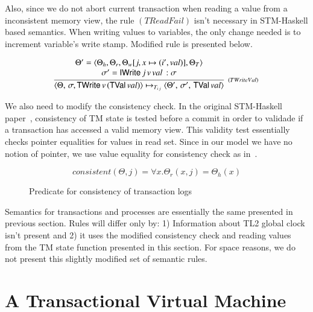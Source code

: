 \documentclass[3p,times,procedia]{elsarticle}
\theoremstyle{definition}
\newcommand{\C}[1]{\red{\mathsf{#1}}}
\begin{document}
Also, since we do not abort current transaction when reading a value from a inconsistent
memory view, the rule $(TReadFail)$ isn't necessary in STM-Haskell based semantics. When writing
values to variables, the only change needed is to increment variable's write stamp.
Modified rule is presented below.

\[
  \begin{array}{l}
  \infer[_{(TWriteVal)}]
        { \langle \Theta, \, \sigma, \ensuremath{\C{TWrite}}\,v\,(\ensuremath{\C{TVal}}\,val)\rangle \mapsto_{T_{i\,j}}
          \langle \Theta', \, \sigma',\,\ensuremath{\C{TVal}}\,val\rangle}
        {\begin{array}{c}
            \Theta' = \langle \Theta_h, \Theta_r, \Theta_w[j,x \mapsto (i',val)], \Theta_T\rangle \\
            \sigma' = \ensuremath{\C{IWrite}}\,j\,v\,val\, : \sigma \\
         \end{array}}
  \end{array}
\]


We also need to modify the consistency check. In the original STM-Haskell paper~\cite{Harris05}, consistency
of TM state is tested before a commit in order to validade if a transaction has accessed a valid memory view.
This validity test essentially checks pointer equalities for values in read set. Since in our model we have no
notion of pointer, we use value equality for consistency check as in~\cite{Hu08}.
\begin{figure}[h]
  \[
     consistent(\Theta,j) = \forall x. \Theta_r(x,j) = \Theta_h(x)
  \]
  \centering
  \caption{Predicate for consistency of transaction logs}
  \label{fig:consistency1}
\end{figure}

Semantics for transactions and processes are essentially the same presented in previous section. Rules will
differ only by: 1) Information about TL2 global clock isn't present and 2) it uses the modified consistency
check and reading values from the TM state function presented in this section. For space reasons, we do not
present this slightly modified set of semantic rules.


\section{A Transactional Virtual Machine}\label{sec:stm-vm}

\end{document}
